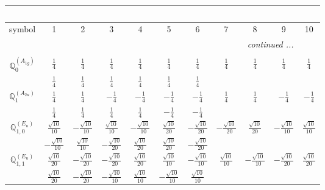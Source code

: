 \documentclass[fleqn,10pt,landscape]{article}
\begin{document}
\begin{itemize}
{\begin{center}
\begin{longtable}{ccccccccccc}
\multicolumn{10}{l}{\tablename\ \thetable{}} \\
 \hline \hline
symbol & 1 & 2 & 3 & 4 & 5 & 6 & 7 & 8 & 9 & 10 \\ \hline \endhead

 \hline \hline
\multicolumn{10}{r}{\footnotesize\it continued ...} \\ \endfoot

 \hline \hline
\multicolumn{10}{r}{} \\ \endlastfoot

$\mathbb{Q}_{0}^{(A_{1g})}$ & $ \frac{1}{4} $ & $ \frac{1}{4} $ & $ \frac{1}{4} $ & $ \frac{1}{4} $ & $ \frac{1}{4} $ & $ \frac{1}{4} $ & $ \frac{1}{4} $ & $ \frac{1}{4} $ & $ \frac{1}{4} $ & $ \frac{1}{4} $ \\
& $ \frac{1}{4} $ & $ \frac{1}{4} $ & $ \frac{1}{4} $ & $ \frac{1}{4} $ & $ \frac{1}{4} $ & $ \frac{1}{4} $ & $  $ & $  $ & $  $ & $  $ \\ \hline
$\mathbb{Q}_{1}^{(A_{2u})}$ & $ \frac{1}{4} $ & $ \frac{1}{4} $ & $ - \frac{1}{4} $ & $ - \frac{1}{4} $ & $ - \frac{1}{4} $ & $ - \frac{1}{4} $ & $ \frac{1}{4} $ & $ \frac{1}{4} $ & $ - \frac{1}{4} $ & $ - \frac{1}{4} $ \\
& $ \frac{1}{4} $ & $ \frac{1}{4} $ & $ \frac{1}{4} $ & $ \frac{1}{4} $ & $ - \frac{1}{4} $ & $ - \frac{1}{4} $ & $  $ & $  $ & $  $ & $  $ \\ \hline
$\mathbb{Q}_{1,0}^{(E_{u})}$ & $ \frac{\sqrt{10}}{10} $ & $ - \frac{\sqrt{10}}{10} $ & $ \frac{\sqrt{10}}{10} $ & $ - \frac{\sqrt{10}}{10} $ & $ \frac{\sqrt{10}}{20} $ & $ - \frac{\sqrt{10}}{20} $ & $ - \frac{\sqrt{10}}{20} $ & $ \frac{\sqrt{10}}{20} $ & $ - \frac{\sqrt{10}}{10} $ & $ \frac{\sqrt{10}}{10} $ \\
& $ - \frac{\sqrt{10}}{10} $ & $ \frac{\sqrt{10}}{10} $ & $ - \frac{\sqrt{10}}{20} $ & $ \frac{\sqrt{10}}{20} $ & $ \frac{\sqrt{10}}{20} $ & $ - \frac{\sqrt{10}}{20} $ & $  $ & $  $ & $  $ & $  $ \\ \hline
$\mathbb{Q}_{1,1}^{(E_{u})}$ & $ \frac{\sqrt{10}}{20} $ & $ - \frac{\sqrt{10}}{20} $ & $ - \frac{\sqrt{10}}{20} $ & $ \frac{\sqrt{10}}{20} $ & $ \frac{\sqrt{10}}{10} $ & $ - \frac{\sqrt{10}}{10} $ & $ \frac{\sqrt{10}}{10} $ & $ - \frac{\sqrt{10}}{10} $ & $ - \frac{\sqrt{10}}{20} $ & $ \frac{\sqrt{10}}{20} $ \\
& $ \frac{\sqrt{10}}{20} $ & $ - \frac{\sqrt{10}}{20} $ & $ - \frac{\sqrt{10}}{10} $ & $ \frac{\sqrt{10}}{10} $ & $ - \frac{\sqrt{10}}{10} $ & $ \frac{\sqrt{10}}{10} $ & $  $ & $  $ & $  $ & $  $ \\ \hline

\end{longtable}
\end{center}}
\end{itemize}
\end{document}
